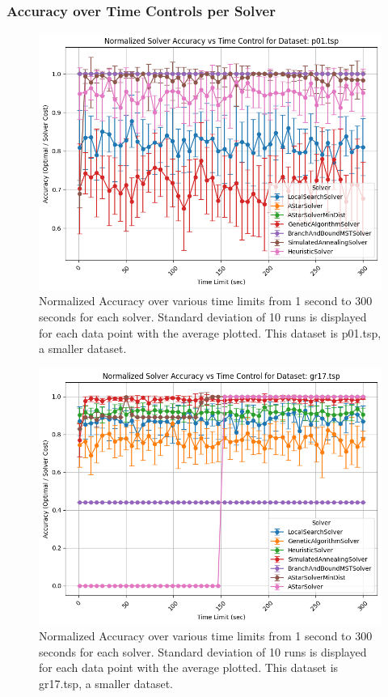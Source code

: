 \documentclass[11pt]{article}
\begin{document}
	\subsubsection{Accuracy over Time Controls per Solver}
	\begin{figure}[H]
		\centering
		\includegraphics[width=0.7\linewidth]{figures/accuracy_line_p01.tsp}
		\caption{Normalized Accuracy over various time limits from 1 second to 300 seconds for each solver. Standard deviation of 10 runs is displayed for each data point with the average plotted. This dataset is p01.tsp, a smaller dataset.}
		\label{fig:accuracylinep01}
	\end{figure}
	\begin{figure}[H]
		\centering
		\includegraphics[width=0.7\linewidth]{figures/accuracy_line_gr17.tsp}
		\caption{Normalized Accuracy over various time limits from 1 second to 300 seconds for each solver. Standard deviation of 10 runs is displayed for each data point with the average plotted. This dataset is gr17.tsp, a smaller dataset.}
		\label{fig:accuracylinegr17}
	\end{figure}
\end{document}
